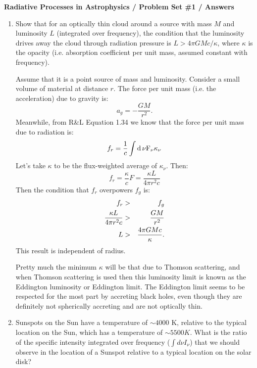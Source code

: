 \documentclass[11pt, preprint]{article}
\begin{document}
\begin{center}
  {\bf Radiative Processes in Astrophysics / Problem Set \#1 /
    Answers}
\end{center}

\begin{enumerate}
\item Show that for an optically thin cloud around a source with mass
  $M$ and luminosity $L$ (integrated over frequency), the condition
  that the luminosity drives away the cloud through radiation pressure
  is $L>4\pi G M c/\kappa$, where $\kappa$ is the opacity
  (i.e. absorption coefficient per unit mass, assumed constant with
  frequency).

\begin{answer}
Assume that it is a point source of mass and luminosity. Consider a
small volume of material at distance $r$. The force per unit mass
(i.e. the acceleration) due to gravity is:
\begin{equation}
a_g = - \frac{GM}{r^2}.
\end{equation}
Meanwhile, from R\&L Equation 1.34 we know that the force per unit
mass due to radiation is:
\begin{equation}
f_r = \frac{1}{c} \int \rm{d}\,\nu F_\nu \kappa_\nu
\end{equation}
Let's take $\kappa$ to be the flux-weighted average of
$\kappa_\nu$. Then:
\begin{equation}
f_r = \frac{\kappa}{c} F = \frac{\kappa L}{4\pi r^2 c}
\end{equation}
Then the condition that $f_r$ overpowers $f_g$ is:
\begin{eqnarray}
f_r &>& f_g \cr
\frac{\kappa L}{4 \pi r^2 c} &>& \frac{GM}{r^2} \cr
L &>& \frac{4 \pi GM c}{\kappa}.
\end{eqnarray}
This result is independent of radius.

Pretty much the minimum $\kappa$ will be that due to Thomson
scattering, and when Thomson scattering is used then this luminosity
limit is known as the Eddington luminosity or Eddington limit. The
Eddington limit seems to be respected for the most part by accreting
black holes, even though they are definitely not spherically accreting
and are not optically thin.
\end{answer}
\item Sunspots on the Sun have a temperature of $\sim 4000$ K,
  relative to the typical location on the Sun, which has a temperature
  of $\sim 5500 K$. What is the ratio of the specific intensity
  integrated over frequency ($\int d\nu I_\nu$) that we should observe
  in the location of a Sunspot relative to a typical location on the
  solar disk?


\end{enumerate}
\end{document}
